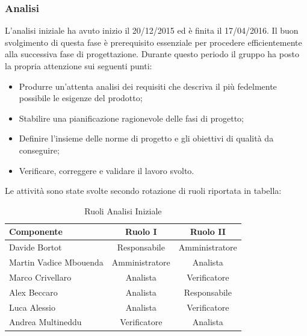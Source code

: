 \documentclass[a4paper,11pt]{article}
\begin{document}
		\subsubsection{Analisi}
		L'analisi iniziale ha avuto inizio il 20/12/2015 ed è finita il 17/04/2016. Il buon svolgimento di questa fase è prerequisito essenziale per procedere efficientemente alla successiva fase di progettazione. Durante questo periodo il gruppo ha posto la propria attenzione sui seguenti punti:
		\begin{itemize}
		\item Produrre un'attenta analisi dei requisiti che descriva il più fedelmente possibile le esigenze del prodotto;
		\item Stabilire una pianificazione ragionevole delle fasi di progetto;
		\item Definire l'insieme delle norme di progetto e gli obiettivi di qualità da conseguire;
		\item Verificare, correggere e validare il lavoro svolto.
		\end{itemize}
		Le attività sono state svolte secondo rotazione di ruoli riportata in tabella:
		\begin{table}[h!]			
		\begin{center}
			\begin{tabular}{l c c}
			\textbf{Componente} & \textbf{Ruolo I} & \textbf{Ruolo II} \\
			\midrule
			Davide Bortot & Responsabile & Amministratore\\
			Martin Vadice Mbouenda & Amministratore & Analista\\
			Marco Crivellaro & Analista & Verificatore\\
			Alex Beccaro & Analista & Responsabile\\
			Luca Alessio & Analista & Verificatore\\
			Andrea Multineddu & Verificatore & Analista\\
			\midrule
			\end{tabular}
		\end{center}
		\caption{Ruoli Analisi Iniziale}
		\end{table}
		
\end{document}
